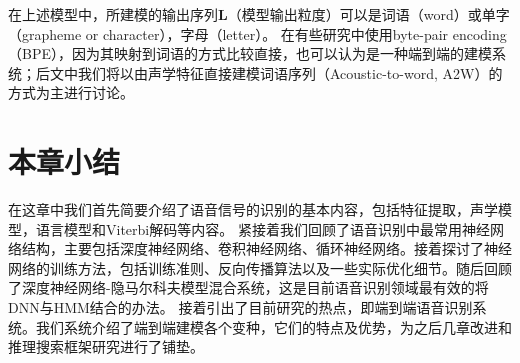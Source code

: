 在上述模型中，所建模的输出序列$\mathbf{L}$（模型输出粒度）可以是词语（word）或单字（grapheme or character），字母（letter）。
在有些研究中使用byte-pair encoding （BPE），因为其映射到词语的方式比较直接，也可以认为是一种端到端的建模系统；后文中我们将以由声学特征直接建模词语序列（Acoustic-to-word, A2W）的方式为主进行讨论。




\section{本章小结}
\label{chap:intro-sum}

在这章中我们首先简要介绍了语音信号的识别的基本内容，包括特征提取，声学模型，语言模型和Viterbi解码等内容。
%
紧接着我们回顾了语音识别中最常用神经网络结构，主要包括深度神经网络、卷积神经网络、循环神经网络。接着探讨了神经网络的训练方法，包括训练准则、反向传播算法以及一些实际优化细节。随后回顾了深度神经网络-隐马尔科夫模型混合系统，这是目前语音识别领域最有效的将DNN与HMM结合的办法。
接着引出了目前研究的热点，即端到端语音识别系统。我们系统介绍了端到端建模各个变种，它们的特点及优势，为之后几章改进和推理搜索框架研究进行了铺垫。